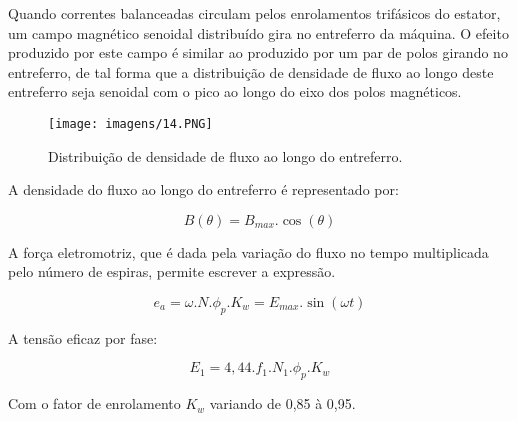 Quando correntes balanceadas circulam pelos enrolamentos trifásicos do estator, um campo magnético senoidal distribuído gira no entreferro da máquina. O efeito produzido por este campo é similar ao produzido por um par de polos girando no entreferro, de tal forma que a distribuição de densidade de fluxo ao longo deste entreferro seja senoidal com o pico ao longo do eixo dos polos magnéticos.

\begin{figure}[ht!]
\center 
\texttt{[image: imagens/14.PNG]}
\caption{Distribuição de densidade de fluxo ao longo do entreferro.}\label{fig:14}
\end{figure}

A densidade do fluxo ao longo do entreferro é representado por:

$$B(\theta) = B_{max}. \cos(\theta)$$

A força eletromotriz, que é dada pela variação do fluxo no tempo multiplicada pelo número de espiras, permite escrever a expressão.

$$e_a = \omega . N. {\phi}_p . K_w = E_{max} . \sin(\omega t)$$

A tensão eficaz por fase:

$$E_1 = 4,44 . f_1 . N_1 . \phi_p . K_w$$

Com o fator de enrolamento $K_w$ variando de 0,85 à 0,95.

